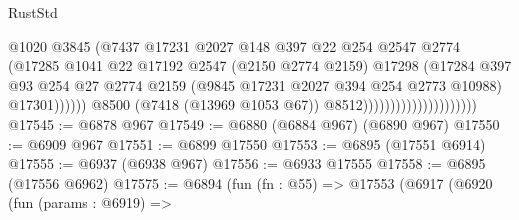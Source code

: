 \begin{lexlean}{RustStd}
\begin{coremodule}
                                                    @1020
                                                    @3845
                                                    (@7437
                                                      @17231
                                                      @2027
                                                      @148
                                                      @397
                                                      @22
                                                      @254
                                                      @2547
                                                      @2774
                                                      (@17285
                                                        @1041
                                                        @22
                                                        @17192
                                                        @2547
                                                        (@2150 @2774 @2159)
                                                        @17298
                                                        (@17284
                                                          @397
                                                          @93
                                                          @254
                                                          @27
                                                          @2774
                                                          @2159
                                                          (@9845
                                                            @17231
                                                            @2027
                                                            @394
                                                            @254
                                                            @2773
                                                            @10988)
                                                          @17301))))))
                                              @8500
                                              (@7418 (@13969 @1053 @67))
                                              @8512)))))))))))))))))))))
@17545 := @6878 @967
@17549 := @6880 (@6884 @967) (@6890 @967)
@17550 := @6909 @967
@17551 := @6899 @17550
@17553 := @6895 (@17551 @6914)
@17555 := @6937 (@6938 @967)
@17556 := @6933 @17555
@17558 := @6895 (@17556 @6962)
@17575 := @6894
    (fun (fn : @55) =>
    @17553
      (@6917
        (@6920
          (fun (params : @6919) =>

\end{coremodule}
\end{lexlean}
